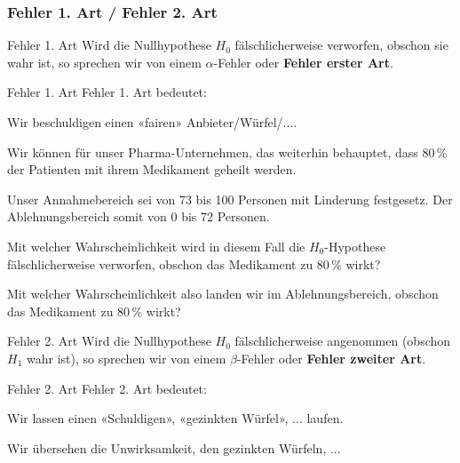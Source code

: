 

\subsubsection{Fehler 1. Art / Fehler 2. Art}


\begin{definition}{Fehler 1. Art}{}
  Wird die Nullhypothese $H_0$ fälschlicherweise verworfen, obschon
  sie wahr ist, so sprechen wir von einem $\alpha$-Fehler oder \textbf{Fehler erster Art}.
\end{definition}

\begin{bemerkung}{Fehler 1. Art}{}
  Fehler 1. Art bedeutet:

  Wir beschuldigen einen «fairen» Anbieter/Würfel/....
  \end{bemerkung}

Wir können für unser Pharma-Unternehmen, das weiterhin behauptet, dass
80\,\% der Patienten mit ihrem Medikament geheilt werden.

Unser Annahmebereich sei von 73 bis 100 Personen mit Linderung
festgesetz. Der Ablehnungsbereich somit von 0 bis 72 Personen.

Mit welcher Wahrscheinlichkeit wird in diesem Fall die $H_0$-Hypothese
fälschlicherweise verworfen, obschon das Medikament zu 80\,\% wirkt?

Mit welcher Wahrscheinlichkeit also landen wir im Ablehnungsbereich,
obschon das Medikament zu 80\,\% wirkt?


\begin{definition}{Fehler 2. Art}{}
  Wird die Nullhypothese $H_0$ fälschlicherweise angenommen (obschon
  $H_1$ wahr ist), so
  sprechen wir von einem $\beta$-Fehler oder \textbf{Fehler zweiter Art}.
\end{definition}
\begin{bemerkung}{Fehler 2. Art}{}
  Fehler 2. Art bedeutet:

  Wir lassen einen «Schuldigen», «gezinkten Würfel», ... laufen.

  Wir übersehen die Unwirksamkeit, den gezinkten Würfeln, ...
\end{bemerkung}


